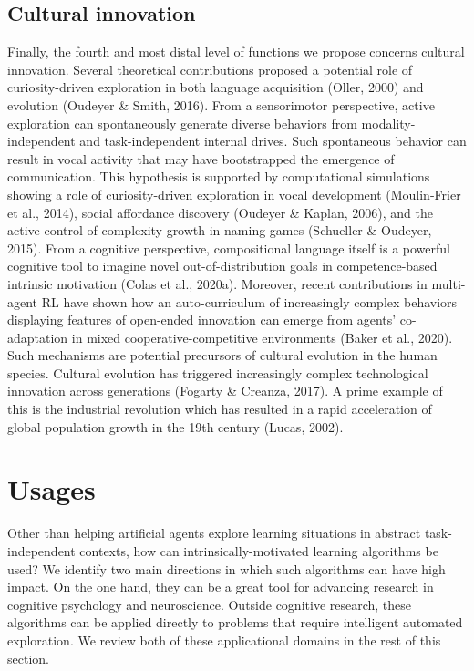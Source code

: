 \subsection{Cultural innovation} Finally, the fourth and most distal level of functions we propose concerns cultural innovation. Several theoretical contributions proposed a potential role of curiosity-driven exploration in both language acquisition (Oller, 2000) and evolution (Oudeyer \& Smith, 2016). From a sensorimotor perspective, active exploration can spontaneously generate diverse behaviors from modality-independent and task-independent internal drives. Such spontaneous behavior can result in vocal activity that may have bootstrapped the emergence of communication. This hypothesis is supported by computational simulations showing a role of curiosity-driven exploration in vocal development (Moulin-Frier et al., 2014), social affordance discovery (Oudeyer \& Kaplan, 2006), and the active control of complexity growth in naming games (Schueller \& Oudeyer, 2015). From a cognitive perspective, compositional language itself is a powerful cognitive tool to imagine novel out-of-distribution goals in competence-based intrinsic motivation (Colas et al., 2020a).  Moreover, recent contributions in multi-agent \ac{RL} have shown how an auto-curriculum of increasingly complex behaviors displaying features of open-ended innovation can emerge from agents’ co-adaptation in mixed cooperative-competitive environments (Baker et al., 2020). Such mechanisms are potential precursors of cultural evolution in the human species. Cultural evolution has triggered increasingly complex technological innovation across generations (Fogarty \& Creanza, 2017). A prime example of this is the industrial revolution which has resulted in a rapid acceleration of global population growth in the 19th century (Lucas, 2002).

\section{Usages}\label{sec:3-usages}
Other than helping artificial agents explore learning situations in abstract task-independent contexts, how can intrinsically-motivated learning algorithms be used? We identify two main directions in which such algorithms can have high impact. On the one hand, they can be a great tool for advancing research in cognitive psychology and neuroscience. Outside cognitive research, these algorithms can be applied directly to problems that require intelligent automated exploration. We review both of these applicational domains in the rest of this section.
    
